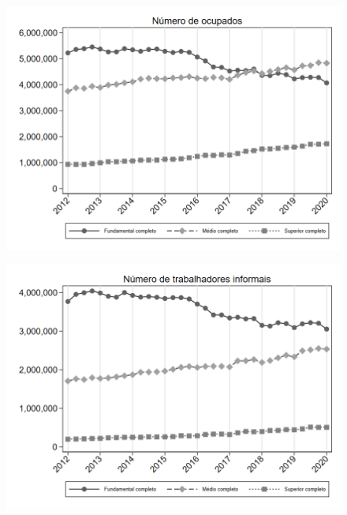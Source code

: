 \begin{frame}[label=_composicao_demografica_educacao_n_de_ocupacao]{}
\textit{\hyperlink{_composicao_demografica_educacao}{}}
\begin{figure}
  \centering
  \includegraphics[width=1\linewidth]{../../analysis/output/composicao_demografica/educacao/_composicao_demografica_educacao_n_de_ocupacao.png}
  \caption{}
  \label{fig:_composicao_demografica_educacao_n_de_ocupacao}
\end{figure}
\end{frame}

\begin{frame}[label=_composicao_demografica_educacao_n_de_informalidade]{}
\textit{\hyperlink{_composicao_demografica_educacao}{}}
\begin{figure}
  \centering
  \includegraphics[width=1.0\linewidth]{../../analysis/output/composicao_demografica/educacao/_composicao_demografica_educacao_n_de_informalidade.png}
  \caption{}
  \label{fig:_composicao_demografica_educacao_n_de_informalidade}
\end{figure}
\end{frame}

